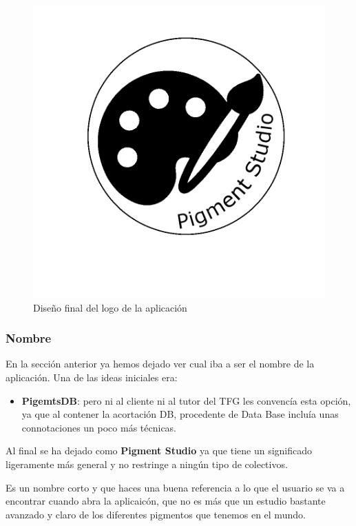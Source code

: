 \begin{figure}[H]
    \centering
    \includegraphics[scale=0.3]{imagenes/diseno/logo3.png}
    \caption{Diseño final del logo de la aplicación}
    \label{fig:logo3}
\end{figure}

\subsubsection*{Nombre}

En la sección anterior ya hemos dejado ver cual iba a ser el nombre de la aplicación. Una de las ideas iniciales era:
\begin{itemize}
    \item \textbf{PigemtsDB}: pero ni al cliente ni al tutor del TFG les convencía esta opción, ya que al contener la acortación DB, procedente de Data Base incluía unas connotaciones un poco más técnicas.
\end{itemize}

Al final se ha dejado como \textbf{Pigment Studio} ya que tiene un significado ligeramente más general y no restringe a ningún tipo de colectivos. 

Es un nombre corto y que haces una buena referencia a lo que el usuario se va a encontrar cuando abra la aplicaicón, que no es más que un estudio bastante avanzado y claro de los diferentes pigmentos que tenemos en el mundo. 

